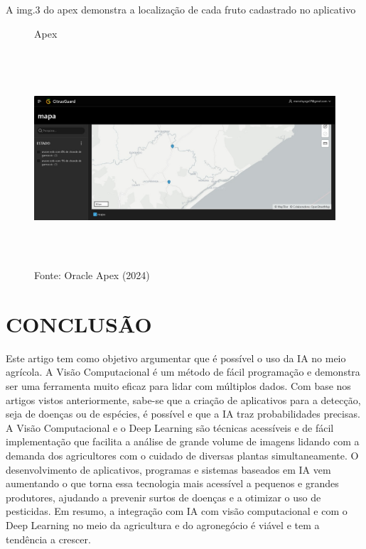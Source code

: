 \documentclass[
  a4paper,%
  12pt,%
  english,%
  brazilian,%
]{article}
\begin{document}
A img.3 do apex demonstra a localização de cada fruto cadastrado no aplicativo

\begin{figure}[H]
    \centering
    \caption*{Apex}
    \includegraphics[width=14cm,height=8cm]{Illustrations/APEX3.jpg}
    \caption*{Fonte: Oracle Apex (2024)}
    \label{fig:apex3}
\end{figure}\label{sect:resultados}



\section*{CONCLUSÃO}Este artigo tem como objetivo argumentar que é possível o uso da IA no meio agrícola. A Visão Computacional é um método de fácil programação e demonstra ser uma ferramenta muito eficaz para lidar com múltiplos dados. Com base nos artigos vistos anteriormente, sabe-se que a criação de aplicativos para a detecção, seja de doenças ou de espécies, é possível e que a IA traz probabilidades precisas. A Visão Computacional e o Deep Learning  são técnicas acessíveis e de fácil implementação que facilita a análise de grande volume de imagens lidando com a demanda dos agricultores com o cuidado de diversas plantas simultaneamente. O desenvolvimento de aplicativos, programas e sistemas baseados em IA vem aumentando o que torna essa tecnologia mais acessível a pequenos e grandes produtores, ajudando a prevenir surtos de doenças e a otimizar o uso de pesticidas. Em resumo, a integração com IA com visão computacional e com o Deep Learning no meio da agricultura e do agronegócio é viável e tem a tendência a crescer.
\label{sect:conclusao}



\printbibliography

%

\end{document}
